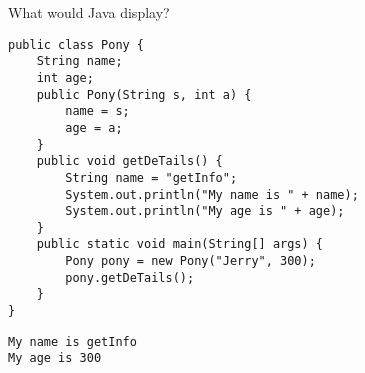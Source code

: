 \begin{blocksection}
\question What would Java display?

\begin{lstlisting}
public class Pony {
    String name;
    int age;
    public Pony(String s, int a) {
        name = s;
        age = a;
    }
    public void getDeTails() {
        String name = "getInfo";
        System.out.println("My name is " + name);
        System.out.println("My age is " + age);
    }
    public static void main(String[] args) {
        Pony pony = new Pony("Jerry", 300);
        pony.getDeTails();
    }
}
\end{lstlisting}

\begin{solution}[1.5in]
\begin{verbatim}
My name is getInfo
My age is 300
\end{verbatim}
\end{solution}
\end{blocksection}
